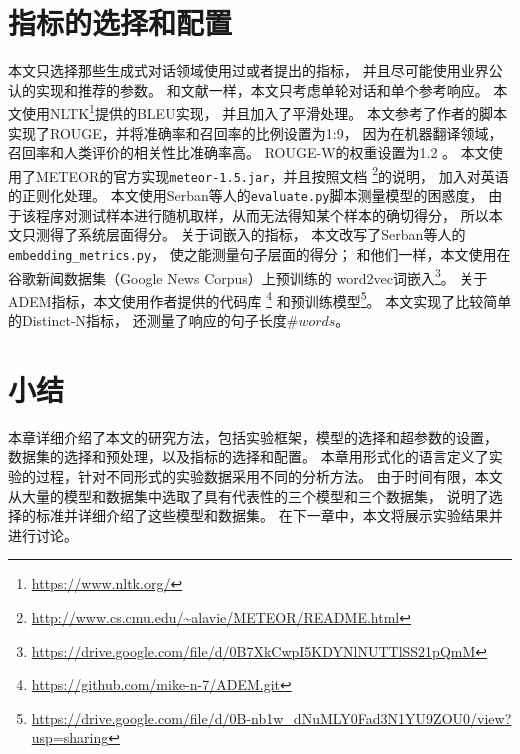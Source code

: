 \section{指标的选择和配置}\label{sec:metric_config}
本文只选择那些生成式对话领域使用过或者提出的指标，
并且尽可能使用业界公认的实现和推荐的参数。
和文献\cite{HowNot}一样，本文只考虑单轮对话和单个参考响应。
本文使用NLTK\footnote{\url{https://www.nltk.org/}}提供的BLEU实现，
并且加入了平滑处理。
本文参考了作者的脚本实现了ROUGE，并将准确率和召回率的比例设置为1:9，
因为在机器翻译领域，召回率和人类评价的相关性比准确率高。
ROUGE-W的权重设置为1.2 。
本文使用了METEOR的官方实现\texttt{meteor-1.5.jar}，并且按照文档
\footnote{\url{http://www.cs.cmu.edu/~alavie/METEOR/README.html}}的说明，
加入对英语的正则化处理。
本文使用Serban等人的\texttt{evaluate.py}脚本测量模型的困惑度，
由于该程序对测试样本进行随机取样，从而无法得知某个样本的确切得分，
所以本文只测得了系统层面得分。
关于词嵌入的指标，
本文改写了Serban等人的\texttt{embedding\_metrics.py}，
使之能测量句子层面的得分；
和他们一样，本文使用在谷歌新闻数据集（Google News Corpus）上预训练的
word2vec词嵌入\footnote{\url{https://drive.google.com/file/d/0B7XkCwpI5KDYNlNUTTlSS21pQmM}}。
关于ADEM指标，本文使用作者提供的代码库
\footnote{\url{https://github.com/mike-n-7/ADEM.git}}
和预训练模型\footnote{\url{https://drive.google.com/file/d/0B-nb1w_dNuMLY0Fad3N1YU9ZOU0/view?usp=sharing}}。
本文实现了比较简单的Distinct-N指标，
还测量了响应的句子长度$\textit{\#words}$。

\section{小结}\label{sec:method_conclusion}
本章详细介绍了本文的研究方法，包括实验框架，模型的选择和超参数的设置，
数据集的选择和预处理，以及指标的选择和配置。
本章用形式化的语言定义了实验的过程，针对不同形式的实验数据采用不同的分析方法。
由于时间有限，本文从大量的模型和数据集中选取了具有代表性的三个模型和三个数据集，
说明了选择的标准并详细介绍了这些模型和数据集。
在下一章中，本文将展示实验结果并进行讨论。
